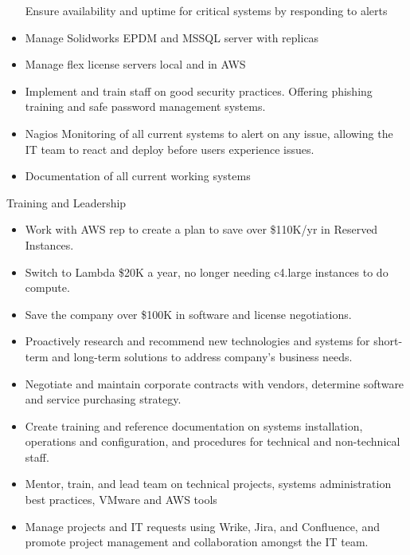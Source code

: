 \documentclass[]{article}
\providecommand{\tightlist}{%
  \setlength{\itemsep}{0pt}\setlength{\parskip}{0pt}}
\begin{document}
\begin{itemize}
  Ensure availability and uptime for critical systems by responding to
  alerts\\
\item
  Manage Solidworks EPDM and MSSQL server with replicas\\
\item
  Manage flex license servers local and in AWS\\
\item
  Implement and train staff on good security practices. Offering
  phishing training and safe password management systems.\\
\item
  Nagios Monitoring of all current systems to alert on any issue,
  allowing the IT team to react and deploy before users experience
  issues.\\
\item
  Documentation of all current working systems
\end{itemize}

Training and Leadership

\begin{itemize}
\tightlist
\item
  Work with AWS rep to create a plan to save over \$110K/yr in Reserved
  Instances.\\
\item
  Switch to Lambda \$20K a year, no longer needing c4.large instances to
  do compute.\\
\item
  Save the company over \$100K in software and license negotiations.\\
\item
  Proactively research and recommend new technologies and systems for
  short-term and long-term solutions to address company's business
  needs.\\
\item
  Negotiate and maintain corporate contracts with vendors, determine
  software and service purchasing strategy.\\
\item
  Create training and reference documentation on systems installation,
  operations and configuration, and procedures for technical and
  non-technical staff.\\
\item
  Mentor, train, and lead team on technical projects, systems
  administration best practices, VMware and AWS tools\\
\item
  Manage projects and IT requests using Wrike, Jira, and Confluence, and
  promote project management and collaboration amongst the IT team.
\end{itemize}
\end{document}
